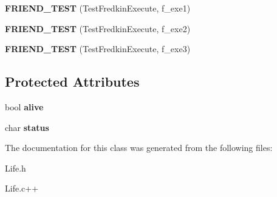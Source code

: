 \begin{DoxyCompactItemize}
\item 
\hypertarget{classAbstractCell_a1b169f2f1ed4f3f9dcf811f6f0563547}{{\bfseries F\-R\-I\-E\-N\-D\-\_\-\-T\-E\-S\-T} (Test\-Fredkin\-Execute, f\-\_\-exe1)}\label{classAbstractCell_a1b169f2f1ed4f3f9dcf811f6f0563547}

\item 
\hypertarget{classAbstractCell_a4b37875c3a56d2c770ac8df9155ed513}{{\bfseries F\-R\-I\-E\-N\-D\-\_\-\-T\-E\-S\-T} (Test\-Fredkin\-Execute, f\-\_\-exe2)}\label{classAbstractCell_a4b37875c3a56d2c770ac8df9155ed513}

\item 
\hypertarget{classAbstractCell_a05687b0b9308abae21888164cec46d8b}{{\bfseries F\-R\-I\-E\-N\-D\-\_\-\-T\-E\-S\-T} (Test\-Fredkin\-Execute, f\-\_\-exe3)}\label{classAbstractCell_a05687b0b9308abae21888164cec46d8b}

\end{DoxyCompactItemize}
\subsection*{Protected Attributes}
\begin{DoxyCompactItemize}
\item 
\hypertarget{classAbstractCell_aa92e42d5bb67f3249d8e2dde2c3228e7}{bool {\bfseries alive}}\label{classAbstractCell_aa92e42d5bb67f3249d8e2dde2c3228e7}

\item 
\hypertarget{classAbstractCell_ad478280ffd92771aaa8e84bb48dd3d52}{char {\bfseries status}}\label{classAbstractCell_ad478280ffd92771aaa8e84bb48dd3d52}

\end{DoxyCompactItemize}


The documentation for this class was generated from the following files\-:\begin{DoxyCompactItemize}
\item 
Life.\-h\item 
Life.\-c++\end{DoxyCompactItemize}
